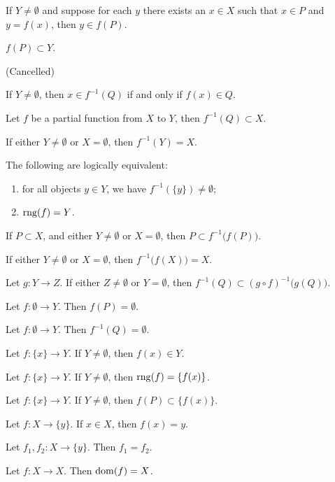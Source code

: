 \documentclass{article}
\begin{document}
\begin{thm}
\item\label{funct2:35} If $Y\neq\emptyset$ and suppose for each $y$ there
  exists an $x\in X$ such that $x\in P$ and $y=f(x)$, then $y\in f(P)$.
\item\label{funct2:36} $f(P)\subset Y$.
\item\label{funct2:37} (Cancelled)
\item\label{funct2:38} If $Y\neq\emptyset$, then $x\in f^{-1}(Q)$ if and
  only if $f(x)\in Q$.
\item\label{funct2:39} Let $f$ be a partial function from $X$ to $Y$,
  then $f^{-1}(Q)\subset X$. 
\item\label{funct2:40} If either $Y\neq\emptyset$ or $X=\emptyset$, then
  $f^{-1}(Y)=X$. 
\item\label{funct2:41} The following are logically equivalent:
  \begin{enumerate}[label=(\roman*)]
  \item for all objects $y\in Y$, we have $f^{-1}(\{y\})\neq\emptyset$;
  \item $\operatorname{rng}(f)=Y$.
  \end{enumerate}
\item\label{funct2:42} If $P\subset X$, and either $Y\neq\emptyset$ or $X=\emptyset$,
  then $P\subset f^{-1}\bigl(f(P)\bigr)$.
\item\label{funct2:43} If either $Y\neq\emptyset$ or $X=\emptyset$, then $f^{-1}\bigl(f(X)\bigr)=X$.
\item\label{funct2:44} Let $g\colon Y\to Z$. If either $Z\neq\emptyset$
  or $Y=\emptyset$, then $f^{-1}(Q)\subset (g\circ f)^{-1}\bigl(g(Q)\bigr)$.
\item\label{funct2:45} Let $f\colon\emptyset\to Y$. Then $f(P)=\emptyset$.
\item\label{funct2:46} Let $f\colon\emptyset\to Y$. Then $f^{-1}(Q)=\emptyset$.
\item\label{funct2:47} Let $f\colon\{x\}\to Y$. If $Y\neq\emptyset$,
  then $f(x)\in Y$.
\item\label{funct2:48} Let $f\colon\{x\}\to Y$. If $Y\neq\emptyset$,
  then $\operatorname{rng}(f)=\{f(x)\}$.
\item\label{funct2:49} Let $f\colon\{x\}\to Y$.
  If $Y\neq\emptyset$, then $f(P)\subset\{f(x)\}$.
\item\label{funct2:50} Let $f\colon X\to\{y\}$.
  If $x\in X$, then $f(x)=y$.
\item\label{funct2:51} Let $f_{1},f_{2}\colon X\to\{y\}$.
  Then $f_{1}=f_{2}$.
\item\label{funct2:52} Let $f\colon X\to X$. Then $\operatorname{dom}(f)=X$.
\end{thm}
\end{document}

